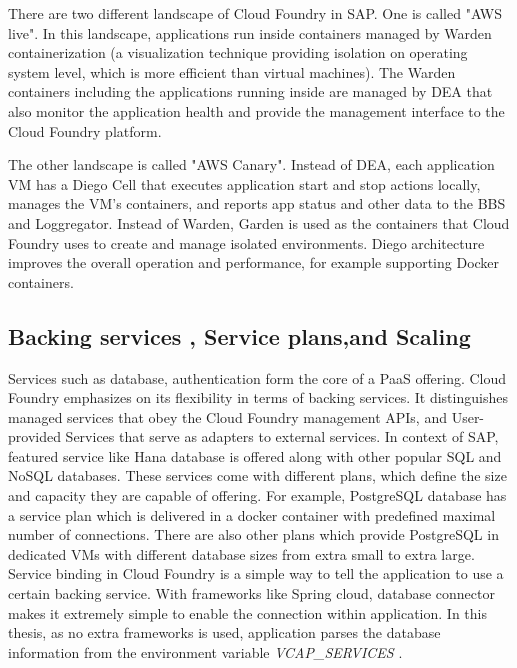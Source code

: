 There are two different landscape of Cloud Foundry in SAP. One is called "AWS live". In this landscape, applications run inside containers managed by Warden   \citep{Warden} containerization (a visualization technique providing isolation on operating system level, which is more efficient than virtual machines). The Warden containers including the applications running inside are managed by \ac{DEA} that also monitor the application health and provide the management interface to the Cloud Foundry platform.

The other landscape is called "AWS Canary". Instead of \ac{DEA}, each application VM has a Diego Cell   \citep{Diego} that executes application start and stop actions locally, manages the VM’s containers, and reports app status and other data to the \ac{BBS} \citep{BBS} and Loggregator. Instead of Warden, Garden \citep{Garden} is used as the containers that Cloud Foundry uses to create and manage isolated environments. Diego architecture improves the overall operation and performance, for example supporting Docker containers.

\subsection{ Backing services , Service plans,and Scaling}
Services such as database, authentication form the core of a \ac{PaaS} offering. Cloud Foundry emphasizes on its flexibility in terms of backing services. It distinguishes managed services that obey the Cloud Foundry management APIs, and User-provided Services that serve as adapters to external services. In context of SAP, featured service like Hana database is offered along with other popular SQL and NoSQL databases. These services come with different plans, which define the size and capacity they are capable of offering. For example, PostgreSQL database has a service plan which is delivered in a docker container with predefined maximal number of connections. There are also other plans which provide PostgreSQL in dedicated VMs with different database sizes from extra small to extra large. \\
Service binding in Cloud Foundry is a simple way to tell the application to use a certain backing service. With frameworks like Spring cloud, database connector makes it extremely simple to enable the connection within application. In this thesis, as no extra frameworks is used, application parses the database information from the environment variable \textit{VCAP\_SERVICES} . \\

